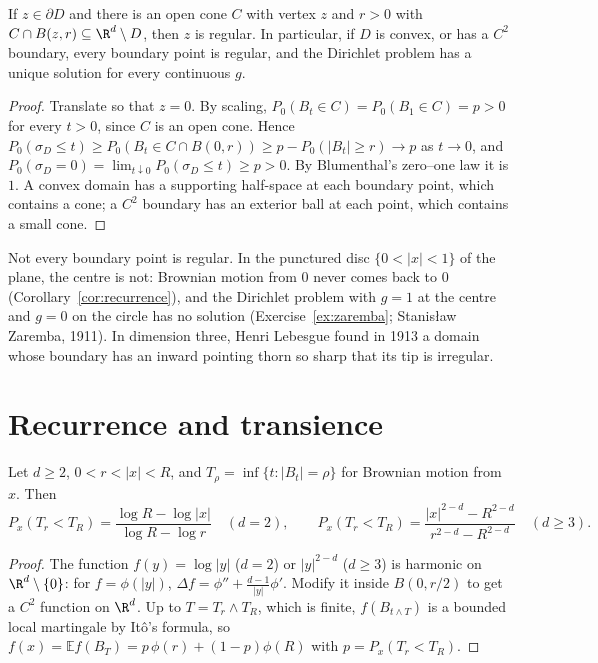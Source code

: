 \begin{theorem}\label{thm:cone}
If $z\in\partial D$ and there is an open cone $C$ with vertex $z$ and $r>0$ with $C\cap B(z,r)\subseteq\R^d\setminus D$, then $z$ is regular. In particular, if $D$ is convex, or has a $C^2$ boundary, every boundary point
is regular, and the Dirichlet problem has a unique solution for every continuous $g$.
\end{theorem}

\begin{proof}
Translate so that $z=0$. By scaling, $P_0(B_t\in C)=P_0(B_1\in C)=p>0$ for every $t>0$, since $C$ is an open cone. Hence $P_0(\sigma_D\le t)\ge P_0(B_t\in C\cap B(0,r))\ge p-P_0(|B_t|\ge r)\to p$ as $t\to0$, and
$P_0(\sigma_D=0)=\lim_{t\downarrow0}P_0(\sigma_D\le t)\ge p>0$. By Blumenthal's zero--one law it is $1$. A convex domain has a supporting half-space at each boundary point, which contains a cone; a $C^2$ boundary has an
exterior ball at each point, which contains a small cone.
\end{proof}

Not every boundary point is regular. In the punctured disc $\{0<|x|<1\}$ of the plane, the centre is not: Brownian motion from $0$ never comes back to $0$ (Corollary~\ref{cor:recurrence}), and the Dirichlet problem with
$g=1$ at the centre and $g=0$ on the circle has no solution (Exercise~\ref{ex:zaremba}; Stanis\l aw Zaremba, 1911). In dimension three, Henri Lebesgue found in 1913 a domain whose boundary has an inward
pointing thorn so sharp that its tip is irregular.

\section{Recurrence and transience}

\begin{theorem}\label{thm:annulus}
Let $d\ge2$, $0<r<|x|<R$, and $T_\rho=\inf\{t:|B_t|=\rho\}$ for Brownian motion from $x$. Then
\[
P_x(T_r<T_R)=\frac{\log R-\log|x|}{\log R-\log r}\quad(d=2),\qquad P_x(T_r<T_R)=\frac{|x|^{2-d}-R^{2-d}}{r^{2-d}-R^{2-d}}\quad(d\ge3).
\]
\end{theorem}

\begin{proof}
The function $f(y)=\log|y|$ ($d=2$) or $|y|^{2-d}$ ($d\ge3$) is harmonic on $\R^d\setminus\{0\}$: for $f=\phi(|y|)$, $\Delta f=\phi''+\frac{d-1}{|y|}\phi'$. Modify it inside $B(0,r/2)$ to get a $C^2$ function on $\R^d$. Up to $T=T_r\wedge T_R$,
which is finite, $f(B_{t\wedge T})$ is a bounded local martingale by It\^o's formula, so $f(x)=\mathbb Ef(B_T)=p\,\phi(r)+(1-p)\phi(R)$ with $p=P_x(T_r<T_R)$.
\end{proof}

